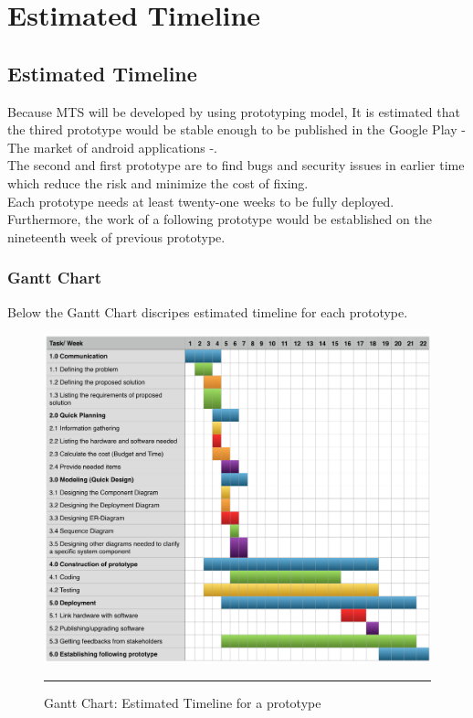 \chapter{Estimated Timeline} 

\label{Chapter3} 


\doublespacing

\section{Estimated Timeline}
Because MTS will be developed by using prototyping model, It is estimated that the thired prototype would be stable enough to be published in the Google Play - The market of android applications -.\linebreak \\

The second and first prototype are to find bugs and security issues in earlier time which reduce the risk and minimize the cost of fixing.\linebreak \\

Each prototype needs at least twenty-one weeks to be fully deployed. Furthermore, the work of a following prototype would be established on the nineteenth week of previous prototype. \\

\pagebreak

\subsection{Gantt Chart}

Below the Gantt Chart discripes estimated timeline for each prototype.\\

\begin{figure}[H]
	\centering
	\includegraphics[scale=0.55]{Figures/FigureGanttChart.png}
	\rule{35em}{0.5pt}
	\caption[Gantt Chart: Estimated Timeline for a prototype]{Gantt Chart: Estimated Timeline for a prototype}
\end{figure}





